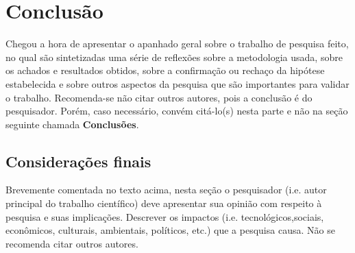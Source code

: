 \chapter{Conclusão}
\label{chap:conc}

Chegou a hora de apresentar o apanhado geral sobre o trabalho de
pesquisa feito, no qual s\~ao sintetizadas uma s\'erie de
reflex\~oes sobre a metodologia usada, sobre os achados e
resultados obtidos, sobre a confirma\c{c}\~ao ou recha\c{c}o da
hip\'otese estabelecida e sobre outros aspectos da pesquisa que
s\~ao importantes para validar o trabalho. Recomenda-se n\~ao
citar outros autores, pois a conclus\~ao \'e do pesquisador.
Por\'em, caso necess\'ario, conv\'em cit\'a-lo(s) nesta parte e
n\~ao na se\c{c}\~ao seguinte chamada \textbf{Conclus\~oes}.


\section{Considerações finais}
\label{sec:consid}

Brevemente comentada no texto acima, nesta se\c{c}\~ao o
pesquisador (i.e. autor principal do trabalho cient\'ifico) deve
apresentar sua opini\~ao com respeito \`a pesquisa e suas
implica\c{c}\~oes. Descrever os impactos (i.e.
tecnol\'ogicos,sociais, econ\^omicos, culturais, ambientais,
políticos, etc.) que a pesquisa causa. N\~ao se recomenda citar
outros autores.

